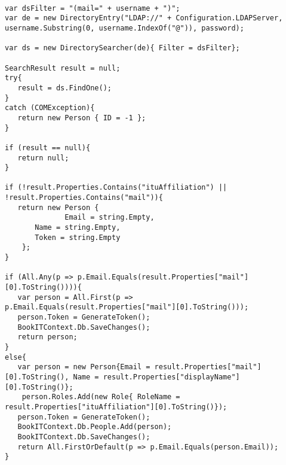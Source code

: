 \begin{lstlisting}[caption=Kode til at hente bruger information, label=AD-GETINFO]

var dsFilter = "(mail=" + username + ")";
var de = new DirectoryEntry("LDAP://" + Configuration.LDAPServer, username.Substring(0, username.IndexOf("@")), password);

var ds = new DirectorySearcher(de){ Filter = dsFilter};

SearchResult result = null;
try{
   result = ds.FindOne();
}
catch (COMException){
   return new Person { ID = -1 };
}

if (result == null){
   return null;
}

if (!result.Properties.Contains("ituAffiliation") || !result.Properties.Contains("mail")){
   return new Person {
              Email = string.Empty, 
	   Name = string.Empty, 
	   Token = string.Empty 
	};
}

if (All.Any(p => p.Email.Equals(result.Properties["mail"][0].ToString()))){
   var person = All.First(p => p.Email.Equals(result.Properties["mail"][0].ToString()));
   person.Token = GenerateToken();
   BookITContext.Db.SaveChanges();
   return person;
}
else{
   var person = new Person{Email = result.Properties["mail"][0].ToString(), Name = result.Properties["displayName"][0].ToString()};
    person.Roles.Add(new Role{ RoleName = result.Properties["ituAffiliation"][0].ToString()});
   person.Token = GenerateToken();
   BookITContext.Db.People.Add(person);
   BookITContext.Db.SaveChanges();
   return All.FirstOrDefault(p => p.Email.Equals(person.Email));
}
\end{lstlisting}